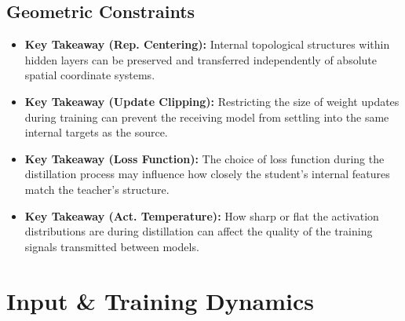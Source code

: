 
\subsection{Geometric Constraints}
\begin{itemize}
     \item \textbf{Key Takeaway (Rep. Centering):} Internal topological structures within hidden layers can be preserved and transferred independently of absolute spatial coordinate systems.
     \item \textbf{Key Takeaway (Update Clipping):} Restricting the size of weight updates during training can prevent the receiving model from settling into the same internal targets as the source. 
     \item \textbf{Key Takeaway (Loss Function):} The choice of loss function during the distillation process may influence how closely the student's internal features match the teacher's structure.
     \item \textbf{Key Takeaway (Act. Temperature):} How sharp or flat the activation distributions are during distillation can affect the quality of the training signals transmitted between models.
 \end{itemize}


\section{Input \& Training Dynamics}

